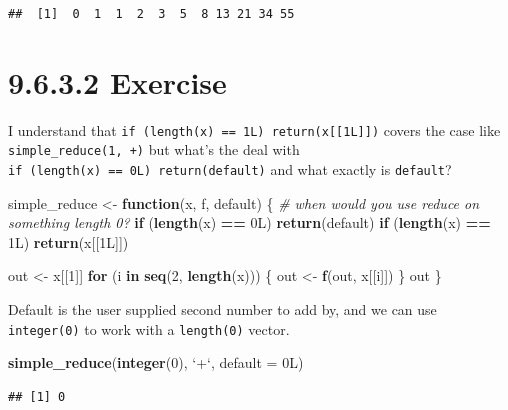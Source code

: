 \documentclass[]{book}
\newenvironment{Shaded}{\begin{snugshade}}{\end{snugshade}}
\newcommand{\CommentTok}[1]{\textcolor[rgb]{0.56,0.35,0.01}{\textit{#1}}}
\newcommand{\ControlFlowTok}[1]{\textcolor[rgb]{0.13,0.29,0.53}{\textbf{#1}}}
\newcommand{\DataTypeTok}[1]{\textcolor[rgb]{0.13,0.29,0.53}{#1}}
\newcommand{\DecValTok}[1]{\textcolor[rgb]{0.00,0.00,0.81}{#1}}
\newcommand{\KeywordTok}[1]{\textcolor[rgb]{0.13,0.29,0.53}{\textbf{#1}}}
\newcommand{\NormalTok}[1]{#1}
\newcommand{\OperatorTok}[1]{\textcolor[rgb]{0.81,0.36,0.00}{\textbf{#1}}}
\newcommand{\StringTok}[1]{\textcolor[rgb]{0.31,0.60,0.02}{#1}}
\begin{document}
\begin{verbatim}
##  [1]  0  1  1  2  3  5  8 13 21 34 55
\end{verbatim}

\hypertarget{exercise-11}{%
\section*{9.6.3.2 Exercise}\label{exercise-11}}

I understand that \texttt{if\ (length(x)\ ==\ 1L)\ return(x{[}{[}1L{]}{]})} covers the case like \texttt{simple\_reduce(1,\ +)} but what's the deal with \texttt{if\ (length(x)\ ==\ 0L)\ return(default)} and what exactly is \texttt{default}?

\begin{Shaded}
\begin{Highlighting}[]
\NormalTok{simple_reduce <-}\StringTok{ }\ControlFlowTok{function}\NormalTok{(x, f, default) \{}
  \CommentTok{# when would you use reduce on something length 0?}
  \ControlFlowTok{if}\NormalTok{ (}\KeywordTok{length}\NormalTok{(x) }\OperatorTok{==}\StringTok{ }\NormalTok{0L) }\KeywordTok{return}\NormalTok{(default)}
  \ControlFlowTok{if}\NormalTok{ (}\KeywordTok{length}\NormalTok{(x) }\OperatorTok{==}\StringTok{ }\NormalTok{1L) }\KeywordTok{return}\NormalTok{(x[[1L]])}

\NormalTok{  out <-}\StringTok{ }\NormalTok{x[[}\DecValTok{1}\NormalTok{]]}
  \ControlFlowTok{for}\NormalTok{ (i }\ControlFlowTok{in} \KeywordTok{seq}\NormalTok{(}\DecValTok{2}\NormalTok{, }\KeywordTok{length}\NormalTok{(x))) \{}
\NormalTok{    out <-}\StringTok{ }\KeywordTok{f}\NormalTok{(out, x[[i]])}
\NormalTok{  \}}
\NormalTok{  out}
\NormalTok{\}}
\end{Highlighting}
\end{Shaded}

Default is the user supplied second number to add by, and we can use \texttt{integer(0)} to work with a \texttt{length(0)} vector.

\begin{Shaded}
\begin{Highlighting}[]
\KeywordTok{simple_reduce}\NormalTok{(}\KeywordTok{integer}\NormalTok{(}\DecValTok{0}\NormalTok{), }\StringTok{`}\DataTypeTok{+}\StringTok{`}\NormalTok{, }\DataTypeTok{default =}\NormalTok{ 0L)}
\end{Highlighting}
\end{Shaded}

\begin{verbatim}
## [1] 0
\end{verbatim}
\end{document}
